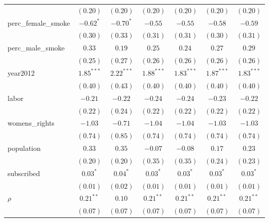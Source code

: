 \begin{table}[!h]
\begin{center}
\begin{tabular}{l c c c c c c }
                        & $(0.20)$     & $(0.20)$     & $(0.20)$     & $(0.20)$     & $(0.20)$     & $(0.20)$     \\
perc\_female\_smoke     & $-0.62^{*}$  & $-0.70^{*}$  & $-0.55$      & $-0.55$      & $-0.58$      & $-0.59$      \\
                        & $(0.30)$     & $(0.33)$     & $(0.31)$     & $(0.31)$     & $(0.30)$     & $(0.31)$     \\
perc\_male\_smoke       & $0.33$       & $0.19$       & $0.25$       & $0.24$       & $0.27$       & $0.29$       \\
                        & $(0.25)$     & $(0.27)$     & $(0.26)$     & $(0.26)$     & $(0.26)$     & $(0.26)$     \\
year2012                & $1.85^{***}$ & $2.22^{***}$ & $1.88^{***}$ & $1.83^{***}$ & $1.87^{***}$ & $1.83^{***}$ \\
                        & $(0.40)$     & $(0.43)$     & $(0.40)$     & $(0.40)$     & $(0.40)$     & $(0.40)$     \\
labor                   & $-0.21$      & $-0.22$      & $-0.24$      & $-0.24$      & $-0.23$      & $-0.22$      \\
                        & $(0.22)$     & $(0.24)$     & $(0.22)$     & $(0.22)$     & $(0.22)$     & $(0.22)$     \\
womens\_rights          & $-1.03$      & $-0.71$      & $-1.04$      & $-1.04$      & $-1.03$      & $-1.03$      \\
                        & $(0.74)$     & $(0.85)$     & $(0.74)$     & $(0.74)$     & $(0.74)$     & $(0.74)$     \\
population              & $0.33$       & $0.35$       & $-0.07$      & $-0.08$      & $0.17$       & $0.23$       \\
                        & $(0.20)$     & $(0.20)$     & $(0.35)$     & $(0.35)$     & $(0.24)$     & $(0.23)$     \\
subscribed              & $0.03^{*}$   & $0.04^{*}$   & $0.03^{*}$   & $0.03^{*}$   & $0.03^{*}$   & $0.03^{*}$   \\
                        & $(0.01)$     & $(0.02)$     & $(0.01)$     & $(0.01)$     & $(0.01)$     & $(0.01)$     \\
$\rho$                  & $0.21^{**}$  & $0.10$       & $0.21^{**}$  & $0.21^{**}$  & $0.21^{**}$  & $0.21^{**}$  \\
                        & $(0.07)$     & $(0.07)$     & $(0.07)$     & $(0.07)$     & $(0.07)$     & $(0.07)$     \\

\end{tabular}
\end{center}
\end{table}
